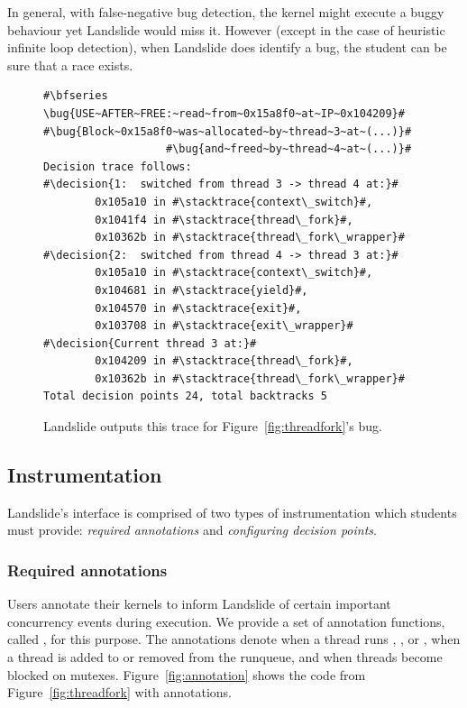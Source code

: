In general, with false-negative bug detection, the kernel might execute a buggy behaviour yet Landslide would miss it. However (except in the case of heuristic infinite loop detection), when Landslide does identify a bug, the student can be sure that a race exists.

\newcommand\bug[1]{\hilight{red}{#1}}
\newcommand\decision[1]{\bfseries \hilight{olivegreen}{#1}}
\newcommand\stacktrace[1]{\hilight{darkcyan}{#1}}
\begin{figure}[t]
\small
\begin{lstlisting}
#\bfseries \bug{USE~AFTER~FREE:~read~from~0x15a8f0~at~IP~0x104209}#
#\bug{Block~0x15a8f0~was~allocated~by~thread~3~at~(...)}#
                   #\bug{and~freed~by~thread~4~at~(...)}#
Decision trace follows:
#\decision{1:  switched from thread 3 -> thread 4 at:}#
        0x105a10 in #\stacktrace{context\_switch}#,
        0x1041f4 in #\stacktrace{thread\_fork}#,
        0x10362b in #\stacktrace{thread\_fork\_wrapper}#
#\decision{2:  switched from thread 4 -> thread 3 at:}#
        0x105a10 in #\stacktrace{context\_switch}#,
        0x104681 in #\stacktrace{yield}#,
        0x104570 in #\stacktrace{exit}#,
        0x103708 in #\stacktrace{exit\_wrapper}#
#\decision{Current thread 3 at:}#
        0x104209 in #\stacktrace{thread\_fork}#,
        0x10362b in #\stacktrace{thread\_fork\_wrapper}#
Total decision points 24, total backtracks 5
\end{lstlisting}
\caption{Landslide outputs this trace for Figure~\ref{fig:threadfork}'s bug.}
\label{fig:trace}
\end{figure}

\subsection{Instrumentation}
\label{sec:instrument}

Landslide's interface is comprised of two types of instrumentation which students must provide: {\em required annotations} and {\em configuring decision points}.

\subsubsection{Required annotations}
Users annotate their kernels to inform Landslide of certain important concurrency events during execution. We provide a set of annotation functions, called , for this purpose. The annotations denote when a thread runs , , or , when a thread is added to or removed from the runqueue, and when threads become blocked on mutexes.
Figure~\ref{fig:annotation} shows the code from Figure~\ref{fig:threadfork} with  annotations.

